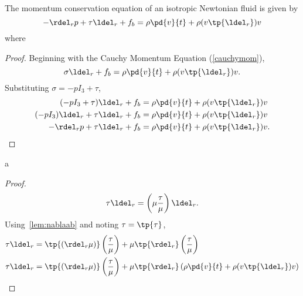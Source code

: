 \begin{thm}
The momentum conservation equation of an isotropic Newtonian fluid is given
by
\begin{equation}
    -\rdel_r p + \tau \ldel_r + f_b = \rho \pd{v}{t} + \rho (v \tp{\ldel_r}) v
\end{equation}
where
\end{thm}
\begin{proof}
Beginning with the Cauchy Momentum Equation (\autoref{cauchymom}),
\begin{equation}
    \sigma \ldel_r + f_b = \rho \pd{v}{t} + \rho (v \tp{\ldel_r}) v.
\end{equation}
Substituting $\sigma = -p I_3 + \tau$,
\begin{align}
    (-p I_3 + \tau) \ldel_r + f_b &= \rho \pd{v}{t} + \rho (v \tp{\ldel_r}) v \\
    (-p I_3)\ldel_r + \tau \ldel_r + f_b &= \rho \pd{v}{t} + \rho (v \tp{\ldel_r}) v \\
    -\rdel_r p + \tau \ldel_r + f_b &= \rho \pd{v}{t} + \rho (v \tp{\ldel_r}) v.
\end{align}
\end{proof}

\begin{thm}
    a
\end{thm}
\begin{proof}
\begin{equation}
    \tau \ldel_r = \left( \mu \frac{\tau }{\mu} \right)  \ldel_r.
\end{equation}
Using~\autoref{lem:nablaab} and noting $\tau = \tp{\tau}$,
\begin{align}
    \tau \ldel_r &= \tp{ (\rdel_r \mu ) } \left( \frac{\tau}{\mu} \right)
        + \mu \tp{\rdel_r} \left( \frac{\tau}{\mu} \right) \\
    \tau \ldel_r &= \tp{ (\rdel_r \mu ) } \left( \frac{\tau}{\mu} \right)
        + \mu \tp{\rdel_r} \left( \rho \pd{v}{t} + \rho (v \tp{\ldel_r}) v \right) \\
\end{align}
\end{proof}
